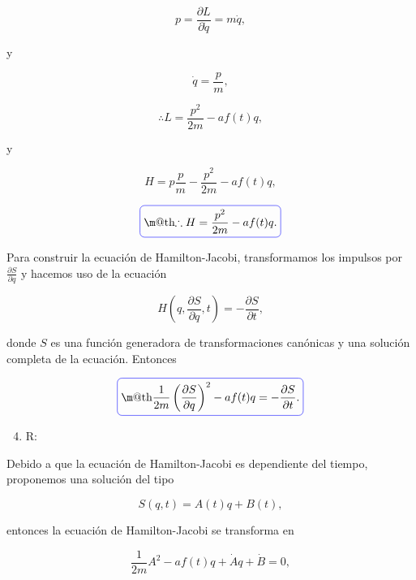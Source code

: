 \documentclass[a4paper,10pt]{article}
\makeatletter
\numberwithin{equation}{section}
\newcommand*{\boxcolor}{blue}
\renewcommand{\boxed}[1]{\textcolor{\boxcolor}{%
\tikz[baseline={([yshift=-1ex]current bounding box.center)}] \node [rectangle, minimum width=1ex,rounded corners,draw] {\normalcolor\m@th$\displaystyle#1$};}}
\makeatother
\begin{document}
\begin{equation}
 p = \frac{\partial L}{\partial \dot{q}} = m\dot{q},
\end{equation}

y 

\begin{equation}
 \dot{q} = \frac{p}{m},
\end{equation}

\begin{equation}
 \therefore L = \frac{p^2}{2m} - af(t)q,
\end{equation}

y

\begin{equation}
 H = p\frac{p}{m} - \frac{p^2}{2m} - af(t)q,
\end{equation}

\begin{equation}
 \boxed{\therefore H = \frac{p^2}{2m} - af(t)q.}
\end{equation}

Para construir la ecuación de Hamilton-Jacobi, transformamos los impulsos por 
$\frac{\partial S}{\partial q}$ y hacemos uso de la ecuación 

\begin{equation}
 H\left(q,\frac{\partial S}{\partial q},t\right) = - \frac{\partial S}{\partial t},
\end{equation}

donde $S$ es una función generadora de transformaciones canónicas y una solución 
completa de la ecuación. Entonces 

\begin{equation}
 \boxed{\frac{1}{2m}\left(\frac{\partial S}{\partial q}\right)^2 - af(t)q = 
 - \frac{\partial S}{\partial t}.}
\end{equation}

\begin{enumerate}[label=\alph*)]
\setcounter{enumi}{3}
 \item R:
\end{enumerate}

Debido a que la ecuación de Hamilton-Jacobi es dependiente del tiempo, proponemos 
una solución del tipo 

\begin{equation}
 S(q,t) = A(t)q + B(t),
\end{equation}

entonces la ecuación de Hamilton-Jacobi se transforma en

\begin{equation}
\frac{1}{2m} A^2 - af(t)q + \dot{A}q + \dot{B} = 0,
\end{equation}
\end{document}
